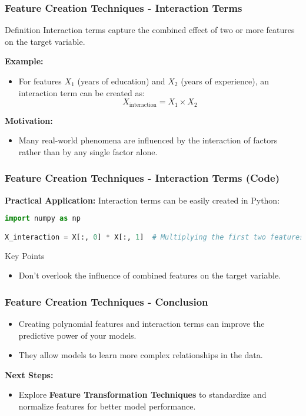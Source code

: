 \documentclass[aspectratio=169]{beamer}
\begin{document}
\begin{frame}[fragile]
    \frametitle{Feature Creation Techniques - Interaction Terms}
    \begin{block}{Definition}
        Interaction terms capture the combined effect of two or more features on the target variable.
    \end{block}

    \textbf{Example:}
    \begin{itemize}
        \item For features \(X_1\) (years of education) and \(X_2\) (years of experience), an interaction term can be created as:
        \begin{equation}
            X_{\text{interaction}} = X_1 \times X_2
        \end{equation}
    \end{itemize}

    \textbf{Motivation:}
    \begin{itemize}
        \item Many real-world phenomena are influenced by the interaction of factors rather than by any single factor alone.
    \end{itemize}
\end{frame}

\begin{frame}[fragile]
    \frametitle{Feature Creation Techniques - Interaction Terms (Code)}
    \textbf{Practical Application:}
    Interaction terms can be easily created in Python:

    \begin{lstlisting}[language=Python]
import numpy as np

X_interaction = X[:, 0] * X[:, 1]  # Multiplying the first two features
    \end{lstlisting}

    \begin{block}{Key Points}
        \begin{itemize}
            \item Don't overlook the influence of combined features on the target variable.
        \end{itemize}
    \end{block}
\end{frame}

\begin{frame}[fragile]
    \frametitle{Feature Creation Techniques - Conclusion}
    \begin{itemize}
        \item Creating polynomial features and interaction terms can improve the predictive power of your models.
        \item They allow models to learn more complex relationships in the data.
    \end{itemize}

    \textbf{Next Steps:}
    \begin{itemize}
        \item Explore \textbf{Feature Transformation Techniques} to standardize and normalize features for better model performance.
    \end{itemize}
\end{frame}
\end{document}
